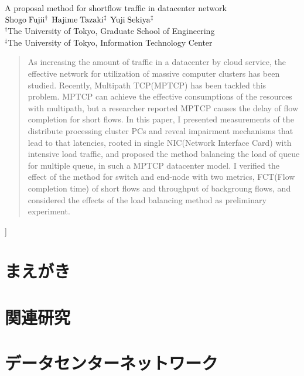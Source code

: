 \documentclass[11pt, a4paper, twocolumn]{jsarticle}
\begin{document}
\begin{center}
{\Large A proposal method for shortflow traffic in datacenter network }\\
\vspace{1em}
{\large ${\rm Shogo\;Fujii^{\dagger}}$
\hspace{1.0cm}${\rm Hajime\;Tazaki^{\ddagger}}$ \hspace{1.0cm}
${\rm Yuji\;Sekiya^{\ddagger}}$}\\
${}^{\dagger}$The University of Tokyo, Graduate School of Engineering\\
${}^{\ddagger}$The University of Tokyo, Information Technology
Center \\
\end{center}
\begin{quotation}
\begin{spacing}{0.6}
{\footnotesize
As increasing the amount of traffic in a datacenter by cloud service, the
effective network for utilization of massive computer clusters has been studied.
Recently, Multipath TCP(MPTCP) has been tackled this problem.
MPTCP can achieve the effective consumptions of the resources with multipath,
but a researcher reported MPTCP causes the delay of flow completion for short
flows.
In this paper, I presented measurements of the distribute processing cluster PCs
and reveal impairment mechanisms that lead to that latencies, rooted in single
NIC(Network Interface Card) with intensive load traffic, and proposed the method balancing
the load of queue for multiple queue, in such a MPTCP datacenter model.
I verified the effect of the method for switch and end-node with two metrics,
FCT(Flow completion time) of short flows and throughput of backgroung flows,
and considered the effects of the load balancing method as preliminary
experiment. }
\end{spacing}
\end{quotation}

\vspace{1.5cm}
]


\section{まえがき}


\section{関連研究}
\label{sec:related}


\section{データセンターネットワーク}
\label{sec:datacenter}
\end{document}

